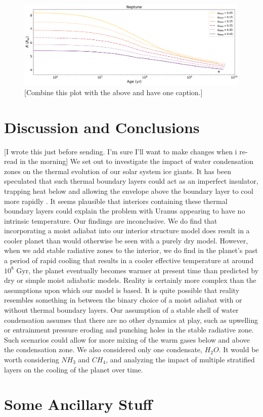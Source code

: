 \documentclass[11pt]{ucscthesisbs}
\begin{document}
\begin{figure}[ht]
 \centerline{
  \includegraphics[scale=0.45]{figures/n_cooling_radius_nz_4096_logx.png}
 }
\caption[Thermal Evolution Curves for Neptune - Radius]
{[Combine this plot with the above and have one caption.] }
\label{fig:evolve_neptune_radius}
\end{figure}



\chapter{Discussion and Conclusions}
[I wrote this just before sending. I'm sure I'll want to make changes when i re-read in the morning]
We set out to investigate the impact of water condensation zones on the thermal evolution of our solar system ice giants. It has been speculated that such thermal boundary layers could act as an imperfect insulator, trapping heat below and allowing the envelope above the boundary layer to cool more rapidly \citep{nettelmann_2016}\citep{friedson_2017}\citep{leconte_2017}\citep{podolak_1991}\citep{scheibe_2019}. It seems plausible that interiors containing these thermal boundary layers could explain the problem with Uranus appearing to have no intrinsic temperature. Our findings are inconclusive. We do find that incorporating a moist adiabat into our interior structure model does result in a cooler planet than would otherwise be seen with a purely dry model. However, when we add stable radiative zones to the interior, we do find in the planet's past a period of rapid cooling that results in a cooler effective temperature at around $10^8$ Gyr, the planet eventually becomes warmer at present time than predicted by dry or simple moist adiabatic models. Reality is certainly more complex than the assumptions upon which our model is based. It is quite possible that reality resembles something in between the binary choice of a moist adiabat with or without thermal boundary layers\citep{guillot_2019}. Our assumption of a stable shell of water condensation assumes that there are no other dynamics at play, such as upwelling or entrainment pressure \citep{friedson_2017} eroding and punching holes in the stable radiative zone. Such scenarios could allow for more mixing of the warm gases below and above the condensation zone. We also considered only one condensate, $H_{2}O$. It would be worth considering $NH_{3}$ and $CH_{4}$, and analyzing the impact of multiple stratified layers on the cooling of the planet over time.



\appendix
\chapter{Some Ancillary Stuff}

\newcommand{\newblock}{}

\end{document}
